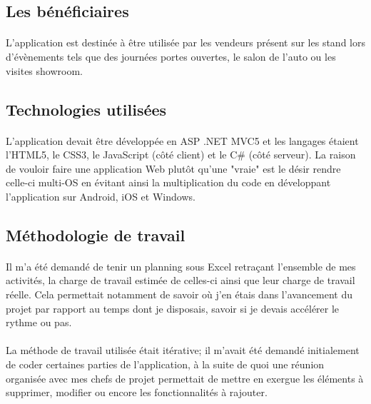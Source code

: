 \documentclass[12pt]{report}
\begin{document}
\subsection{Les bénéficiaires}
\paragraph{}
L'application est destinée à être utilisée par les vendeurs présent sur les stand lors d'évènements tels que des journées portes ouvertes, le salon de l'auto ou les visites showroom.

\subsection{Technologies utilisées}
\paragraph{}
L'application devait être développée en ASP .NET MVC5 et les langages étaient l'HTML5, le CSS3, le JavaScript (côté client) et le C\# (côté serveur). La raison de vouloir faire une application Web plutôt qu'une "vraie" est le désir rendre celle-ci multi-OS en évitant ainsi la multiplication du code en développant l'application sur Android, iOS et Windows.

\subsection{Méthodologie de travail}
\paragraph{}
Il m'a été demandé de tenir un planning sous Excel retraçant l'ensemble de mes activités, la charge de travail estimée de celles-ci ainsi que leur charge de travail réelle.
Cela permettait notamment de savoir où j'en étais dans l'avancement du projet par rapport au temps dont je disposais, savoir si je devais accélérer le rythme ou pas.

\paragraph{}
La méthode de travail utilisée était itérative; il m’avait été demandé initialement de coder certaines parties de l’application, à la suite de quoi une réunion organisée avec mes chefs de projet permettait de mettre en exergue les éléments à supprimer, modifier ou encore les fonctionnalités à rajouter.
\end{document}
